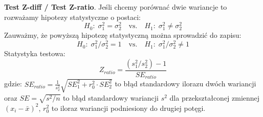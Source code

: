 \documentclass[polish,]{book}
\begin{document}
\textbf{Test Z-diff / Test Z-ratio}. Jeśli chcemy porównać dwie wariancje to rozważamy hipotezy statystyczne o postaci:
\begin{equation}
H_0:\;\sigma_1^2=\sigma_2^2\quad\mbox{vs.}\quad H_1:\;\sigma_1^2\neq\sigma_2^2
\label{eq:v01}
\end{equation}
Zauważmy, że powyższą hipotezę statystyczną można sprowadzić do zapisu:
\begin{equation}
H_{0}:\;\sigma^2_1/\sigma^2_2=1\quad\textrm{vs.}\quad H_{1}:\;\sigma^2_1/\sigma^2_2\neq1
\label{eq:v02}
\end{equation}
Statystyka testowa:
\begin{equation}
Z_{ratio}=\frac{(s^2_1/s^2_2)-1}{SE_{ratio}}
\label{eq:v03}
\end{equation}
gdzie: \(SE_{ratio}=\frac{1}{s_2^{2}}\sqrt{SE_1^2+r_0^2\cdot SE_2^2}\) to błąd standardowy ilorazu dwóch wariancji oraz \(SE=\sqrt{s^2/n}\) to błąd standardowy wariancji \(s^2\) dla przekształconej zmiennej \((x_i-\bar{x})^2\), \(r_0^2\) to iloraz wariancji podniesiony do drugiej potęgi.
\end{document}
